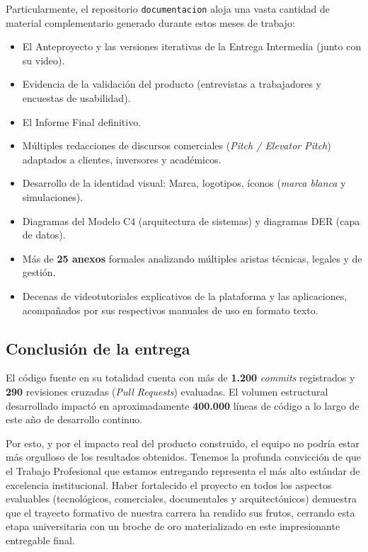 Particularmente, el repositorio \texttt{documentacion} aloja una vasta cantidad de material complementario generado durante estos meses de trabajo:
\begin{itemize}
    \item El Anteproyecto y las versiones iterativas de la Entrega Intermedia (junto con su video).
    \item Evidencia de la validación del producto (entrevistas a trabajadores y encuestas de usabilidad).
    \item El Informe Final definitivo.
    \item Múltiples redacciones de discursos comerciales (\textit{Pitch / Elevator Pitch}) adaptados a clientes, inversores y académicos.
    \item Desarrollo de la identidad visual: Marca, logotipos, íconos (\textit{marca blanca} y simulaciones).
    \item Diagramas del Modelo C4 (arquitectura de sistemas) y diagramas DER (capa de datos).
    \item Más de \textbf{25 anexos} formales analizando múltiples aristas técnicas, legales y de gestión.
    \item Decenas de videotutoriales explicativos de la plataforma y las aplicaciones, acompañados por sus respectivos manuales de uso en formato texto.
\end{itemize}

\subsection{Conclusión de la entrega}

El código fuente en su totalidad cuenta con más de \textbf{1.200} \textit{commits} registrados y \textbf{290} revisiones cruzadas (\textit{Pull Requests}) evaluadas. El volumen estructural desarrollado impactó en aproximadamente \textbf{400.000} líneas de código a lo largo de este año de desarrollo continuo.

Por esto, y por el impacto real del producto construido, el equipo no podría estar más orgulloso de los resultados obtenidos. Tenemos la profunda convicción de que el Trabajo Profesional que estamos entregando representa el más alto estándar de excelencia institucional. Haber fortalecido el proyecto en todos los aspectos evaluables (tecnológicos, comerciales, documentales y arquitectónicos) demuestra que el trayecto formativo de nuestra carrera ha rendido sus frutos, cerrando esta etapa universitaria con un broche de oro materializado en este impresionante entregable final.
